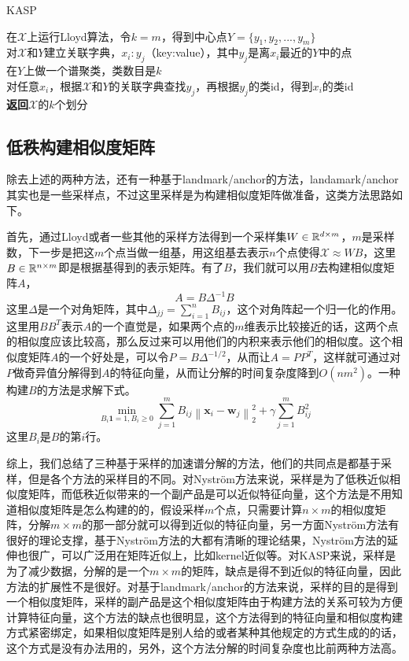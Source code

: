 \begin{algorithm}
    \caption{KASP}\label{alg: KASP}
    在$\mathcal{X}$上运行Lloyd算法，令$k=m$，得到中心点$Y = \{y_1,y_2,...,y_m\}$\\
    对$\mathcal{X}$和$Y$建立关联字典，$x_i:y_j$（key:value），其中$y_j$是离$x_i$最近的$Y$中的点　\\
    在$Y$上做一个谱聚类，类数目是$k$ \\
    对任意$x_i$，根据$\mathcal{X}$和$Y$的关联字典查找$y_j$，再根据$y_j$的类id，得到$x_i$的类id\\
    \textbf{返回}$\mathcal{X}$的$k$个划分
\end{algorithm}

\subsection{低秩构建相似度矩阵}
除去上述的两种方法，还有一种基于landmark/anchor的方法，landamark/anchor其实也是一些采样点，不过这里采样是为构建相似度矩阵做准备，这类方法思路如下。

首先，通过Lloyd或者一些其他的采样方法得到一个采样集$W \in \mathbb{R}^{d \times m}$，$m$是采样数，下一步是把这$m$个点当做一组基，用这组基去表示$n$个点使得$\mathcal{X} \approx WB$，这里$B \in \mathbb{R}^{n \times m}$即是根据基得到的表示矩阵。有了$B$，我们就可以用$B$去构建相似度矩阵$A$，$$A = B\Delta^{-1}B$$ 这里$\Delta$是一个对角矩阵，其中$\Delta_{jj} = \sum_{i=1}^n B_{ij}$，这个对角阵起一个归一化的作用。这里用$BB^T$表示$A$的一个直觉是，如果两个点的$m$维表示比较接近的话，这两个点的相似度应该比较高，那么反过来可以用他们的内积来表示他们的相似度。这个相似度矩阵$A$的一个好处是，可以令$P = B\Delta^{-1/2}$，从而让$A = PP^T$，这样就可通过对$P$做奇异值分解得到$A$的特征向量，从而让分解的时间复杂度降到$O(nm^2)$。一种构建$B$的方法是求解下式。$$\min _{B_i \mathbf{1}=1, B_i \geq 0} \sum_{j=1}^{m} B_{i j}\left\|\mathbf{x}_{i}-\mathbf{w}_{j}\right\|_{2}^{2}+\gamma \sum_{j=1}^{m} B_{i j}^{2}$$ 这里$B_i$是$B$的第$i$行。

综上，我们总结了三种基于采样的加速谱分解的方法，他们的共同点是都基于采样，但是各个方法的采样目的不同。对Nyström方法来说，采样是为了低秩近似相似度矩阵，而低秩近似带来的一个副产品是可以近似特征向量，这个方法是不用知道相似度矩阵是怎么构建的的，假设采样$m$个点，只需要计算$n \times m$的相似度矩阵，分解$m \times m$的那一部分就可以得到近似的特征向量，另一方面Nyström方法有很好的理论支撑，基于Nyström方法的大都有清晰的理论结果，Nyström方法的延伸也很广，可以广泛用在矩阵近似上，比如kernel近似等。对KASP来说，采样是为了减少数据，分解的是一个$m \times m$的矩阵，缺点是得不到近似的特征向量，因此方法的扩展性不是很好。对基于landmark/anchor的方法来说，采样的目的是得到一个相似度矩阵，采样的副产品是这个相似度矩阵由于构建方法的关系可较为方便计算特征向量，这个方法的缺点也很明显，这个方法得到的特征向量和相似度构建方式紧密绑定，如果相似度矩阵是别人给的或者某种其他规定的方式生成的的话，这个方式是没有办法用的，另外，这个方法分解的时间复杂度也比前两种方法高。

